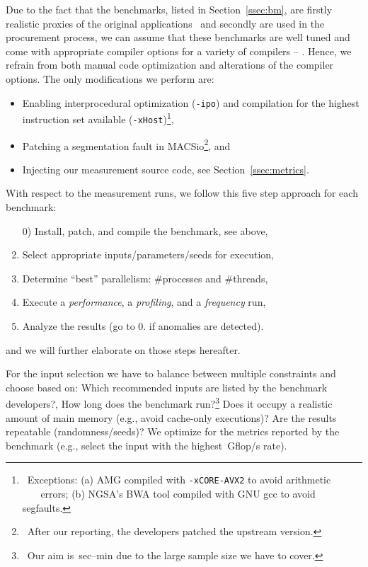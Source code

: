 Due to the fact that the benchmarks, listed in Section~\ref{ssec:bm}, are firstly realistic proxies of the
original applications~\cite{aaziz_methodology_2018} and secondly are used in the procurement process, we can assume
that these benchmarks are well tuned and come with appropriate compiler options for a variety of compilers -- .
Hence, we refrain from both manual code optimization and alterations of the compiler options.
%
%
The only modifications we perform are:
\begin{itemize}
    \item Enabling interprocedural optimization (\texttt{-ipo}) and compilation for the highest instruction set available (\texttt{-xHost})\footnote{~Exceptions: (a) AMG compiled with \texttt{-xCORE-AVX2} to avoid arithmetic \\$~~~\,\quad$errors; (b) NGSA's BWA tool compiled with GNU gcc to avoid segfaults.},
    \item Patching a segmentation fault in MACSio\footnote{~After our reporting, the developers patched the upstream version.}, and
    \item Injecting our measurement source code, see Section~\ref{ssec:metrics}.
\end{itemize}
%
With respect to the measurement runs, we follow this five step approach for each benchmark:
\begin{enumerate}
    \item[0)] Install, patch, and compile the benchmark, see above, 
    \item Select appropriate inputs/parameters/seeds for execution,
    \item Determine ``best'' parallelism: \#processes and \#threads,
    \item Execute a \textit{performance}, a \textit{profiling}, and a \textit{frequency} run,
    \item Analyze the results (go to 0. if anomalies are detected).
\end{enumerate}
and we will further elaborate on those steps hereafter.

%
%
For the input selection we have to balance between multiple constraints and choose based on: Which
recommended inputs are listed by the benchmark developers?, How long does the benchmark run?\footnote{~Our
aim is~\unit[1]{sec}--\unit[10]{min} due to the large sample size we have to cover.} Does it occupy a
realistic amount of main memory (e.g., avoid cache-only executions)? Are the results repeatable
(randomness/seeds)? We optimize for the metrics reported by the benchmark (e.g., select the input
with the highest~\unit[]{Gflop/s} rate).

